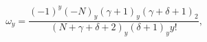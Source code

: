\[\omega_{y}=\frac{(-1)^{y}\left(-N\right)_{y}\left(\gamma+1\right)_{y}\left(%
\gamma+\delta+1\right)_{2}}{\left(N+\gamma+\delta+2\right)_{y}\left(\delta+1%
\right)_{y}y!},\]